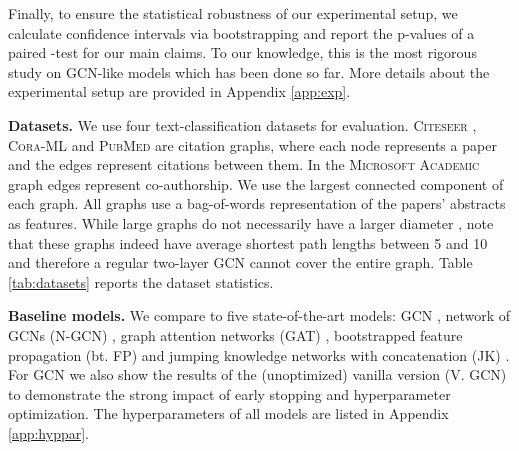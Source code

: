 \documentclass{article} \usepackage{iclr2019_conference,times}
\begin{document}
Finally, to ensure the statistical robustness of our experimental setup, we calculate confidence intervals via bootstrapping and report the p-values of a paired -test for our main claims. To our knowledge, this is the most rigorous study on GCN-like models which has been done so far. More details about the experimental setup are provided in Appendix \ref{app:exp}.

\begin{table}[t]
    \centering
    \caption{Dataset statistics. Shortest path length is denoted by SP.}
    \label{tab:datasets}
\end{table}

\textbf{Datasets.} We use four text-classification datasets for evaluation. \textsc{Citeseer} \citep{sen_collective_2008}, \textsc{Cora-ML} \citep{mccallum_automating_2000,bojchevski_deep_2018} and \textsc{PubMed} \citep{namata_query-driven_2012} are citation graphs, where each node represents a paper and the edges represent citations between them. In the \textsc{Microsoft Academic} graph \citep{shchur_pitfalls_2018} edges represent co-authorship. We use the largest connected component of each graph. All graphs use a bag-of-words representation of the papers' abstracts as features. While large graphs do not necessarily have a larger diameter \citep{leskovec_graphs_2005}, note that these graphs indeed have average shortest path lengths between 5 and 10 and therefore a regular two-layer GCN cannot cover the entire graph. Table \ref{tab:datasets} reports the dataset statistics.

\textbf{Baseline models.} We compare to five state-of-the-art models: GCN \citep{kipf_semi-supervised_2017}, network of GCNs (N-GCN) \citep{abu-el-haija_n-gcn:_2018}, graph attention networks (GAT) \citep{velickovic_graph_2018}, bootstrapped feature propagation (bt. FP) \citep{buchnik_bootstrapped_2018} and jumping knowledge networks with concatenation (JK) \citep{xu_representation_2018}. For GCN we also show the results of the (unoptimized) vanilla version (V. GCN) to demonstrate the strong impact of early stopping and hyperparameter optimization. The hyperparameters of all models are listed in Appendix \ref{app:hyppar}.
\end{document}
